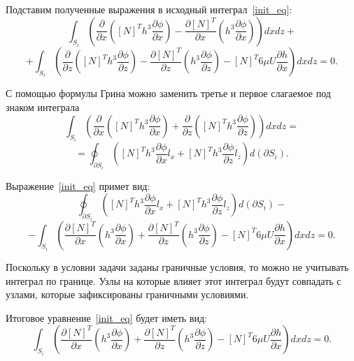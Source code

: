 \documentclass[a4paper,14pt]{extarticle}
\begin{document}
Подставим полученные выражения в исходный интеграл~\eqref{init_eq}:
\begin{equation*}
\int_{S_i} {\left(\frac{\partial}{\partial x} \left( [N]^T h^3 \frac{\partial \phi}{\partial x} \right) - \frac{\partial[N]^T}{\partial x} \left(h^3 \frac{\partial \phi}{\partial x} \right) \right) dxdz} + 
\end{equation*}
\begin{equation*}
 + \int_{S_i} {\left(\frac{\partial}{\partial z} \left( [N]^T h^3 \frac{\partial \phi}{\partial z} \right) - \frac{\partial[N]^T}{\partial z} \left(h^3 \frac{\partial \phi}{\partial z} \right) - [N]^T 6 \mu U \frac{\partial h}{\partial x}\right) dxdz} = 0.
\end{equation*}

С помощью формулы Грина можно заменить третье и первое слагаемое под знаком интеграла
\begin{equation*}
	\int_{S_i} {\left(\frac{\partial}{\partial x} \left( [N]^T h^3 \frac{\partial \phi}{\partial x} \right) + \frac{\partial}{\partial z} \left( [N]^T h^3 \frac{\partial \phi}{\partial z} \right)  \right)   dxdz} =
\end{equation*}
\begin{equation*}
	= \oint_{\partial S_i} { \left( [N]^T h^3 \frac{\partial \phi}{\partial x} l_x +   [N]^T h^3 \frac{\partial \phi}{\partial z} l_z \right)  d \left( \partial S_i \right)}.
\end{equation*}

Выражение~\eqref{init_eq} примет вид:
\begin{equation*}
	\oint_{\partial S_i} { \left( [N]^T h^3 \frac{\partial \phi}{\partial x} l_x +   [N]^T h^3 \frac{\partial \phi}{\partial z} l_z \right)  d \left( \partial S_i \right)} -
\end{equation*}
\begin{equation*}
	- \int_{S_i} {\left( \frac{\partial[N]^T}{\partial x} \left(h^3 \frac{\partial \phi}{\partial x} \right) +  \frac{\partial[N]^T}{\partial z} \left(h^3 \frac{\partial \phi}{\partial z} \right) - [N]^T 6 \mu U \frac{\partial h}{\partial x}\right) dxdz} = 0.
\end{equation*}

Поскольку в условии задачи заданы граничные условия, то можно не учитывать интеграл по границе. Узлы на которые влияет этот интеграл будут совпадать с узлами, которые зафиксированы граничными условиями.

Итоговое уравнение~\eqref{init_eq} будет иметь вид:
\begin{equation*}
	\int_{S_i} {\left( \frac{\partial[N]^T}{\partial x} \left(h^3 \frac{\partial \phi}{\partial x} \right) +  \frac{\partial[N]^T}{\partial z} \left(h^3 \frac{\partial \phi}{\partial z} \right) - [N]^T 6 \mu U \frac{\partial h}{\partial x}\right) dxdz} = 0.
\end{equation*}
\end{document}
